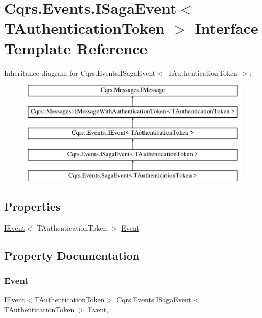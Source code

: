 \hypertarget{interfaceCqrs_1_1Events_1_1ISagaEvent}{}\section{Cqrs.\+Events.\+I\+Saga\+Event$<$ T\+Authentication\+Token $>$ Interface Template Reference}
\label{interfaceCqrs_1_1Events_1_1ISagaEvent}
Inheritance diagram for Cqrs.\+Events.\+I\+Saga\+Event$<$ T\+Authentication\+Token $>$\+:\begin{figure}[H]
\begin{center}
\leavevmode
\includegraphics[height=5.000000cm]{interfaceCqrs_1_1Events_1_1ISagaEvent}
\end{center}
\end{figure}
\subsection*{Properties}
\begin{DoxyCompactItemize}
\item 
\hyperlink{interfaceCqrs_1_1Events_1_1IEvent}{I\+Event}$<$ T\+Authentication\+Token $>$ \hyperlink{interfaceCqrs_1_1Events_1_1ISagaEvent_adc0c41f6a64cadb56d758093c02ef266_adc0c41f6a64cadb56d758093c02ef266}{Event}
\end{DoxyCompactItemize}


\subsection{Property Documentation}
\mbox{\label{interfaceCqrs_1_1Events_1_1ISagaEvent_adc0c41f6a64cadb56d758093c02ef266_adc0c41f6a64cadb56d758093c02ef266}} 
\subsubsection{\texorpdfstring{Event}{Event}}
{\footnotesize\ttfamily \hyperlink{interfaceCqrs_1_1Events_1_1IEvent}{I\+Event}$<$T\+Authentication\+Token$>$ \hyperlink{interfaceCqrs_1_1Events_1_1ISagaEvent}{Cqrs.\+Events.\+I\+Saga\+Event}$<$ T\+Authentication\+Token $>$.Event\hspace{0.3cm}{\ttfamily [get]}, {\ttfamily [set]}}

